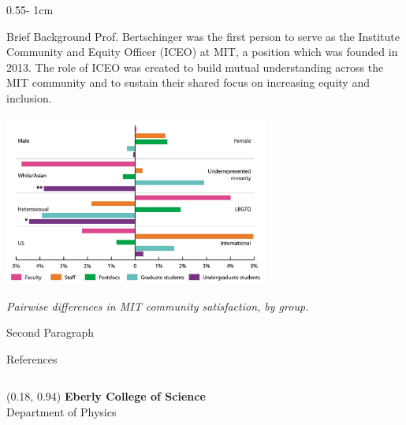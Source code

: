 \documentclass{../psuposter}
\begin{document}
\begin{frame}
\begin{columns}[t, totalwidth=\textwidth]
\begin{column}{0.55\textwidth - 1cm}
    \begin{block}{Brief Background}
    	Prof. Bertschinger was the first person to serve as the Institute Community and Equity Officer (ICEO) at MIT, a position which was founded in 2013. The role of ICEO was created to build mutual understanding across the MIT community and to sustain their shared focus on increasing equity and inclusion. \cite{EdmundBertschingerAppointed}   
        \begin{center}
		   	\includegraphics[width=0.65\textwidth]{images/background} 
		   	
		   	\textit{Pairwise differences in MIT community satisfaction, by group.}\cite{bertschingerAdvancingRespectfulCaring}
    	\end{center}
		Second Paragraph 
    \end{block}


    \begin{block}{References}
        
%        
		
    \end{block}

\end{column}
\end{columns}


\begin{textblock}{0.5}(0.18, 0.94)
    \color{white}
    \sffamily
    \textbf{Eberly College of Science}
    \\
    Department of Physics
\end{textblock}


\end{frame}
\end{document}
